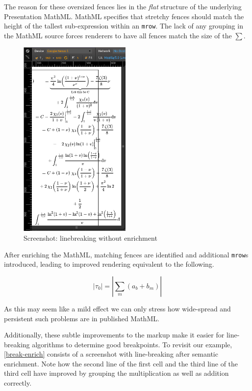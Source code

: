 \documentclass{llncs}
\begin{document}
The reason for these oversized fences lies in the \emph{flat} structure of the 
underlying  Presentation MathML. MathML specifies that 
stretchy fences should match the height of the tallest sub-expression within an 
\texttt{mrow}. The lack of any grouping in the MathML source forces renderers 
to have all fences match the size of the $\sum$. 


\begin{figure}
  \vspace{-25pt}
 \centering 
 \includegraphics[width=0.49\textwidth]{./ex_long_linebreaking_enriched.png}
 \caption{Screenshot: linebreaking without enrichment \label{break-enrich}}
  \vspace{-45pt}
\end{figure}

After enriching the MathML, matching fences are identified and 
additional \texttt{mrow}s introduced, leading to improved rendering equivalent 
to the following.

\[ 
\left\vert  \tau_0 \right\vert = \left \vert \sum_{m} \left(a_b + b_m\right) 
\right\vert 
\]

As this may seem like a mild effect we can only stress how 
wide-spread and persistent such problems are in published MathML.

Additionally, these subtle improvements to the markup make it easier for 
line-breaking algorithms to determine good breakpoints. To revisit our 
example, \autoref{break-enrich} consists of a screenshot with line-breaking 
after semantic enrichment. Note how the second line of the first cell and the 
third line of the third cell have improved by grouping the multiplication as 
well as addition correctly.
\end{document}
